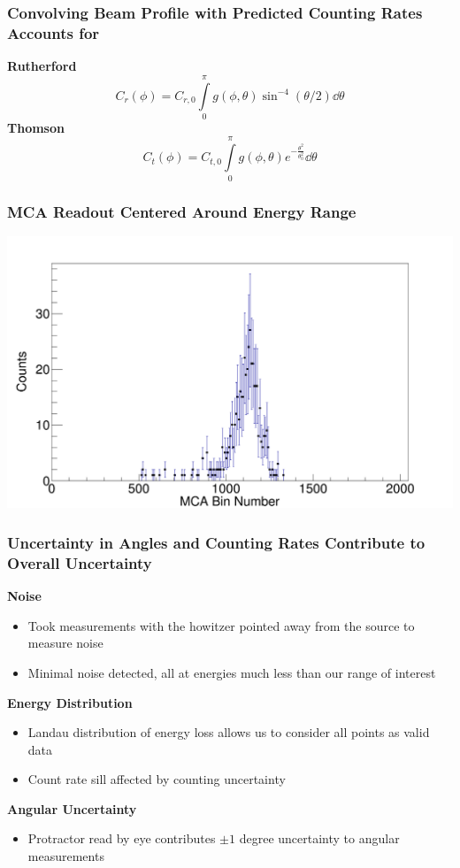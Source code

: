 \documentclass{beamer}
\begin{document}
\begin{frame}
  \frametitle{Convolving Beam Profile with Predicted Counting Rates Accounts for}
  \textbf{Rutherford}
  \begin{equation*}
    C_r(\phi) = C_{r,0}\int\limits_0^\pi g(\phi, \theta) \sin^{-4}(\theta/2) \dd{\theta}
  \end{equation*}
  \textbf{Thomson}
  \begin{equation*}
    C_t(\phi) = C_{t,0} \int\limits_0^\pi g(\phi, \theta) e^{-\frac{\theta^2}{\theta_0^2}}  \dd{\theta}
  \end{equation*}
\end{frame}

\begin{frame}
  \frametitle{MCA Readout Centered Around Energy Range}
  \includegraphics[width=1\textwidth]{mca_readout}
\end{frame}

    \begin{frame}
      \frametitle{Uncertainty in Angles and Counting Rates Contribute to Overall Uncertainty}
             \textbf{Noise}
      \pause
      \begin{itemize}
        \item Took measurements with the howitzer pointed away from the source to measure noise
          \pause
        \item Minimal noise detected, all at energies much less than our range of interest
      \end{itemize}
      \pause
      \textbf{Energy Distribution}
      \begin{itemize}
        \pause
    \item Landau distribution of energy loss allows us to consider all points as valid data
      \pause
    \item Count rate sill affected by counting uncertainty
  \end{itemize}
  \pause

 \textbf{Angular Uncertainty}
  \begin{itemize}
    \pause
  \item Protractor read by eye contributes $\pm 1$ degree uncertainty to angular measurements 
  \end{itemize}
\end{frame}
\end{document}
